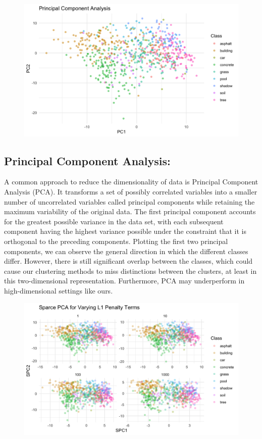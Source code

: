 \documentclass[11pt]{article}
\begin{document}
\begin{figure}
  \centering
  \includegraphics[width=1\linewidth]{pca.png}
  \label{fig:yourlabel}
\end{figure}

\subsection{Principal Component Analysis:}
A common approach to reduce the dimensionality of data is Principal Component Analysis (PCA). It transforms a set of possibly correlated variables into a smaller number of uncorrelated variables called principal components while retaining the maximum variability of the original data. The first principal component accounts for the greatest possible variance in the data set, with each subsequent component having the highest variance possible under the constraint that it is orthogonal to the preceding components. Plotting the first two principal components, we can observe the general direction in which the different classes differ. However, there is still significant overlap between the classes, which could cause our clustering methods to miss distinctions between the clusters, at least in this two-dimensional representation. Furthermore, PCA may underperform in high-dimensional settings like ours.

\begin{figure}
  \centering
  \includegraphics[width=1\linewidth]{Sparce_PCA.png}
  \label{fig:yourlabel}
\end{figure}
\end{document}
